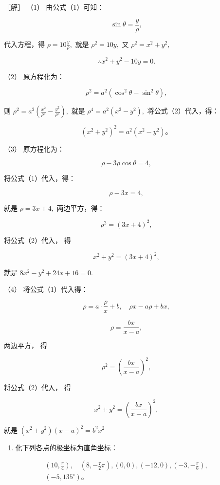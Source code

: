 ［解］ （1） 由公式（1）可知：

\[
\sin \theta = \frac {y}{\rho},
\]

代入方程，得 \(\rho = 10\frac{y}{\rho},\) 就是 \(\rho^2 = 10y,\) 又
\(\rho^2 = x^2 + y^2,\)

\[
\therefore x^{2} + y^{2} - 10 y = 0.
\]

（2） 原方程化为：

\[
\rho^{2} = a^{2} (\cos^{2} \theta - \sin^{2} \theta),
\]

则 \(\rho^2 = a^2\left(\frac{x^2}{\rho^2} -\frac{y^2}{\rho^2}\right),\)
就是 \(\rho^4 = a^2 (x^2 - y^2),\) 将公式（2）代入，得：

\[
(x^{2} + y^{2}) ^ {2} = a^{2} (x^{2} - y^{2})\text{。}
\]

（3） 原方程化为：

\[
\rho - 3 \rho \cos \theta = 4,
\]

将公式（1）代入，得：

\[
\rho - 3 x = 4,
\]

就是 \(\rho = 3x + 4,\) 两边平方，得：

\[
\rho^{2} = (3 x + 4) ^ {2},
\]

将公式（2）代入， 得

\[
x^{2} + y^{2} = (3 x + 4) ^ {2},
\]

就是 \(8x^{2} - y^{2} + 24x + 16 = 0.\)

（4） 将公式（1）代入得：

\[
\rho = a \cdot \frac {\rho}{x} + b, \quad \rho x - a \rho + b x,
\]

\[
\rho = \frac {b x}{x - a},
\]

两边平方， 得

\[
\rho^{2} = \left(\frac {b x}{x - a}\right) ^ {2},
\]

将公式（2）代入， 得

\[
x^{2} + y^{2} = \left(\frac {b x}{x - a}\right) ^ {2},
\]

就是 \((x^{2} + y^{2})(x - a)^{2} = b^{2}x^{2}\)

\begin{enumerate}
\def\labelenumi{\arabic{enumi}.}
\tightlist
\item
  化下列各点的极坐标为直角坐标：
\end{enumerate}

\[
\begin{array}{l} \left(10, \frac {\pi}{4}\right), \quad \left(8, - \frac {7}{2} \pi\right), (0, 0), (- 12, 0), (- 3, - \frac {\pi}{6}), \\ (- 5, 135^{\circ})\text{。} \\ \end{array}
\]

